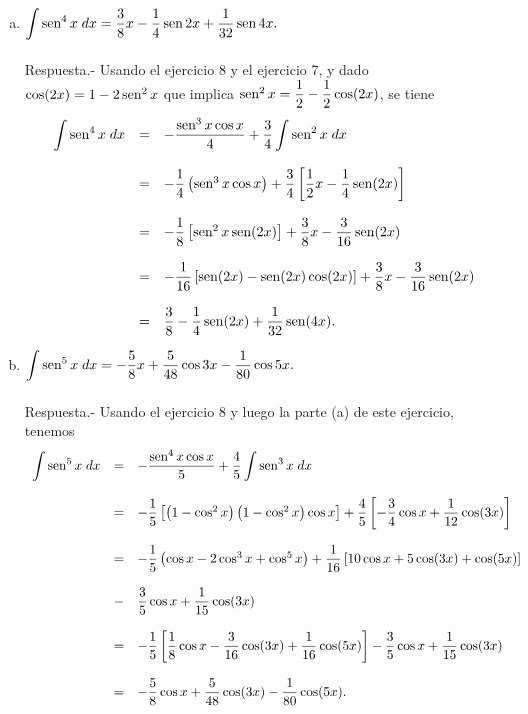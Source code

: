 \begin{enumerate}[\bfseries 1.]
\begin{enumerate}[(a)]
	    \item $\displaystyle\int \mathop{\mbox{\normalfont sen}}\nolimits^4 x\; dx = \dfrac{3}{8}x-\dfrac{1}{4}\mathop{\mbox{\normalfont sen}}\nolimits 2x + \dfrac{1}{32}\mathop{\mbox{\normalfont sen}}\nolimits 4x.$\\\\
		Respuesta.-\; Usando el ejercicio 8 y el ejercicio 7, y dado $\cos(2x)=1-2\mathop{\mbox{\normalfont sen}}\nolimits^2 x$ que implica $\mathop{\mbox{\normalfont sen}}\nolimits^2x=\dfrac{1}{2}-\dfrac{1}{2}\cos(2x)$, se tiene
		$$
		\begin{array}{rcl}
		    \displaystyle\int \mathop{\mbox{\normalfont sen}}\nolimits^4 x\; dx &=& -\dfrac{\mathop{\mbox{\normalfont sen}}\nolimits^3x\cos x}{4} + \dfrac{3}{4}\displaystyle \int \mathop{\mbox{\normalfont sen}}\nolimits^2x\; dx\\\\
						    &=& -\dfrac{1}{4}\left(\mathop{\mbox{\normalfont sen}}\nolimits^3 x \cos x\right) + \dfrac{3}{4}\left[\dfrac{1}{2}x-\dfrac{1}{4}\mathop{\mbox{\normalfont sen}}\nolimits (2x)\right]\\\\
						    &=& -\dfrac{1}{8}\left[\mathop{\mbox{\normalfont sen}}\nolimits^2 x \mathop{\mbox{\normalfont sen}}\nolimits(2x)\right] + \dfrac{3}{8}x-\dfrac{3}{16} \mathop{\mbox{\normalfont sen}}\nolimits(2x)\\\\
						    &=& -\dfrac{1}{16}\left[\mathop{\mbox{\normalfont sen}}\nolimits (2x)-\mathop{\mbox{\normalfont sen}}\nolimits (2x)\cos (2x)\right]+\dfrac{3}{8}x-\dfrac{3}{16}\mathop{\mbox{\normalfont sen}}\nolimits(2x)\\\\
						    &=& \dfrac{3}{8}-\dfrac{1}{4}\mathop{\mbox{\normalfont sen}}\nolimits(2x)+\dfrac{1}{32}\mathop{\mbox{\normalfont sen}}\nolimits(4x).
		\end{array}
		$$
		\vspace{.5cm}

	    \item $\displaystyle\int \mathop{\mbox{\normalfont sen}}\nolimits^5 x\; dx = -\dfrac{5}{8}x+\dfrac{5}{48}\cos 3x - \dfrac{1}{80}\cos 5x.$\\\\
		Respuesta.-\; Usando el ejercicio 8 y luego la parte (a) de este ejercicio, tenemos
		$$
		\begin{array}{rcl}
		    \displaystyle\int \mathop{\mbox{\normalfont sen}}\nolimits^5x\; dx &=& -\dfrac{\mathop{\mbox{\normalfont sen}}\nolimits^4x\cos x}{5} + \dfrac{4}{5}\displaystyle\int \mathop{\mbox{\normalfont sen}}\nolimits^3x\; dx\\\\
						   &=& - \dfrac{1}{5}\left[\left(1-\cos^2 x\right)\left(1-\cos^2 x\right)\cos x\right] +\dfrac{4}{5}\left[-\dfrac{3}{4}\cos x + \dfrac{1}{12}\cos(3x)\right]\\\\
						   &=& -\dfrac{1}{5}\left(\cos x - 2\cos^3x+\cos^5x\right)+\dfrac{1}{16}\left[10\cos x + 5\cos(3x)+\cos(5x)\right]\\\\
						   &-&\dfrac{3}{5}\cos x + \dfrac{1}{15}\cos (3x)\\\\
						   &=&-\dfrac{1}{5}\left[\dfrac{1}{8}\cos x - \dfrac{3}{16}\cos (3x)+\dfrac{1}{16}\cos (5x)\right]-\dfrac{3}{5}\cos x + \dfrac{1}{15}\cos(3x)\\\\
						   &=& -\dfrac{5}{8}\cos x + \dfrac{5}{48}\cos (3x) - \dfrac{1}{80}\cos (5x).
		\end{array}
		$$
		\vspace{.5cm}


\end{enumerate}
\end{enumerate}
